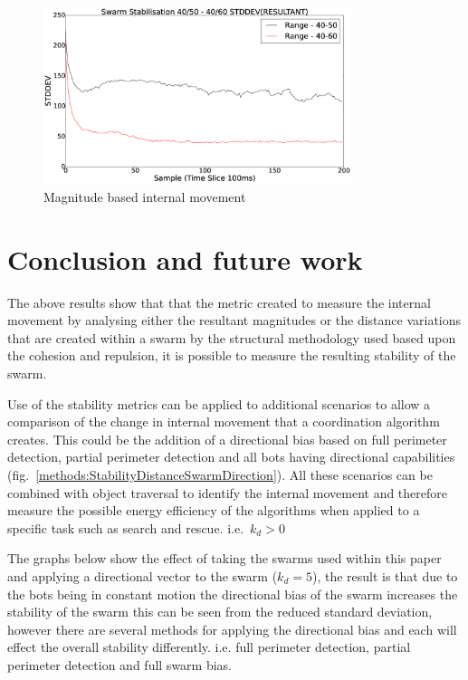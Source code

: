 \documentclass[10pt,journal,letterpaper,twoside]{IEEEtran}
\newcommand{\stability}{internal movement}
\newcommand{\Fig}{fig.}
\begin{document}
\begin{figure}[H]
\begin{center}
\includegraphics[width=9cm]{figures/StabilityMagnitudeSwarm}
\end{center}
\caption{Magnitude based \stability{}\label{methods:StabilityMagnitudeSwarm}}
\end{figure}

\section{Conclusion and future work\label{section:futureWork}}

The above results show that that the metric created to measure the
\stability{} by analysing either the resultant magnitudes or the
distance variations that are created within a swarm by the structural
methodology used based upon the cohesion and repulsion, it is possible
to measure the resulting stability of the swarm.

Use of the stability metrics can be applied to additional scenarios to
allow a comparison of the change in \stability{} that a coordination
algorithm creates. This could be the addition of a directional bias
based on full perimeter detection, partial perimeter detection and all
bots having directional capabilities
(\Fig{}~\ref{methods:StabilityDistanceSwarmDirection}).  All these
scenarios can be combined with object traversal to identify the
\stability{} and therefore measure the possible energy efficiency of
the algorithms when applied to a specific task such as search and
rescue. i.e.~${k_d > 0}$

The graphs below show the effect of taking the swarms used within this
paper and applying a directional vector to the swarm ($k_d = 5$), the
result is that due to the bots being in constant motion the
directional bias of the swarm increases the stability of the swarm
this can be seen from the reduced standard deviation, however there
are several methods for applying the directional bias and each will
effect the overall stability differently. i.e. full perimeter
detection, partial perimeter detection and full swarm bias.
\end{document}
